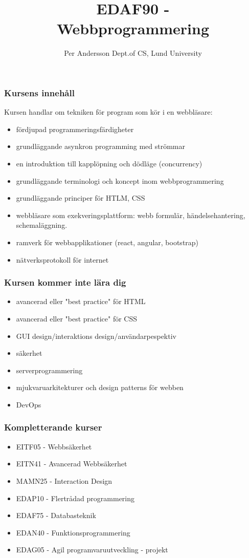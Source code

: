 \documentclass[aspectratio=1610]{beamer}
\title[EDAF90 Webbprogrammering]{EDAF90 - \\Webbprogrammering}
\author[Per Andersson]{%
  Per Andersson\newline
  Dept.\@ of CS, Lund University}
\begin{document}
\begin{frame}[plain]%
  \titlepage
\end{frame}

\begin{frame}
  \frametitle{Kursens innehåll}

Kursen handlar om tekniken för program som kör i en webbläsare:
\begin{itemize}
\item fördjupad programmeringsfärdigheter
\item grundläggande asynkron programming med strömmar
\item en introduktion till kapplöpning och dödläge (concurrency)
\item grundläggande terminologi och koncept inom webbprogrammering
\item grundläggande principer för HTLM, CSS
\item webbläsare som exekveringsplattform: webb formulär, händelsehantering, schemaläggning.
\item ramverk för webbapplikationer (react, angular, bootstrap)
\item nätverksprotokoll för internet
\end{itemize}

\end{frame}


\begin{frame}
  \frametitle{Kursen kommer inte lära dig}
\begin{itemize}
\item avancerad eller "best practice" för HTML
\item avancerad eller "best practice" för CSS
\item GUI design/interaktions design/användarpespektiv
\item säkerhet
\item serverprogrammering
\item mjukvaruarkitekturer och design patterns för webben
\item DevOps
\end{itemize}

\end{frame}

\begin{frame}
  \frametitle{Kompletterande kurser}
\begin{itemize}
\item EITF05 - Webbsäkerhet
\item EITN41 - Avancerad Webbsäkerhet
\item MAMN25 - Interaction Design
\item EDAP10  - Flertrådad programmering
\item EDAF75 - Databasteknik
\item EDAN40 - Funktionsprogrammering
\item EDAG05 - Agil programvaruutveckling - projekt
\end{itemize}

\end{frame}
\end{document}
